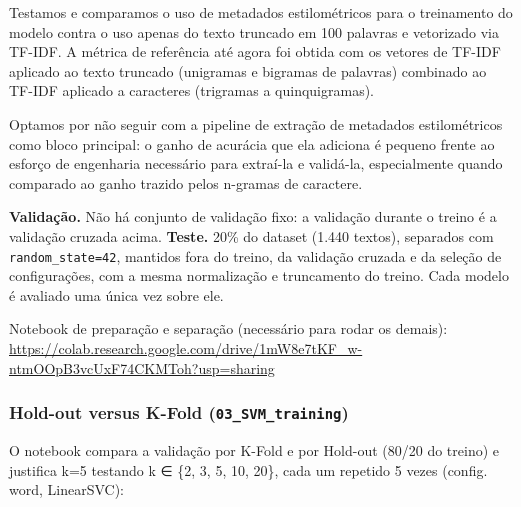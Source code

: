 \documentclass[
  brazilian,
  11pt,
]{article}
\begin{document}
Testamos e comparamos o uso de metadados estilométricos para o treinamento do modelo contra o uso apenas do texto truncado em 100 palavras e vetorizado via TF-IDF. A métrica de referência até agora foi obtida com os vetores de TF-IDF aplicado ao texto truncado (unigramas e bigramas de palavras) combinado ao TF-IDF aplicado a caracteres (trigramas a quinquigramas).

Optamos por não seguir com a pipeline de extração de metadados estilométricos como bloco principal: o ganho de acurácia que ela adiciona é pequeno frente ao esforço de engenharia necessário para extraí-la e validá-la, especialmente quando comparado ao ganho trazido pelos n-gramas de caractere.

\textbf{Validação.} Não há conjunto de validação fixo: a validação durante o treino é a validação cruzada acima. \textbf{Teste.} 20\% do dataset (1.440 textos), separados com \texttt{random\_state=42}, mantidos fora do treino, da validação cruzada e da seleção de configurações, com a mesma normalização e truncamento do treino. Cada modelo é avaliado uma única vez sobre ele.

Notebook de preparação e separação (necessário para rodar os demais): \url{https://colab.research.google.com/drive/1mW8e7tKF_w-ntmOOpB3vcUxF74CKMToh?usp=sharing}

\subsubsection{\texorpdfstring{Hold-out versus K-Fold (\texttt{03\_SVM\_training})}{Hold-out versus K-Fold (03\_SVM\_training)}}\label{hold-out-versus-k-fold-03_svm_training}

O notebook compara a validação por K-Fold e por Hold-out (80/20 do treino) e justifica k=5 testando k ∈ \{2, 3, 5, 10, 20\}, cada um repetido 5 vezes (config. word, LinearSVC):
\end{document}
